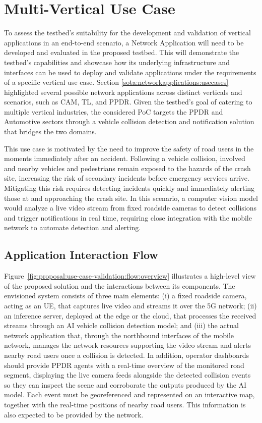 \section{Multi-Vertical Use Case}
\label{chap:proposal:use-case}

To assess the testbed's suitability for the development and validation of vertical applications in an end-to-end scenario, a Network Application will need to be developed and evaluated in the proposed testbed. This will demonstrate the testbed's capabilities and showcase how its underlying infrastructure and interfaces can be used to deploy and validate applications under the requirements of a specific vertical use case. Section \ref{sota:networkapplications:usecases} highlighted several possible network applications across distinct verticals and scenarios, such as \ac{CAM}, \ac{TL}, and \ac{PPDR}. Given the testbed's goal of catering to multiple vertical industries, the considered \ac{PoC} targets the \ac{PPDR} and Automotive sectors through a vehicle collision detection and notification solution that bridges the two domains.

This use case is motivated by the need to improve the safety of road users in the moments immediately after an accident. Following a vehicle collision, involved and nearby vehicles and pedestrians remain exposed to the hazards of the crash site, increasing the risk of secondary incidents before emergency services arrive. Mitigating this risk requires detecting incidents quickly and immediately alerting those at and approaching the crash site. In this scenario, a computer vision model would analyze a live video stream from fixed roadside cameras to detect collisions and trigger notifications in real time, requiring close integration with the mobile network to automate detection and alerting.

\subsection{Application Interaction Flow}
\label{chap:proposal:use-case:flow}

Figure~\ref{fig:proposal:use-case-validation:flow:overview} illustrates a high-level view of the proposed solution and the interactions between its components. The envisioned system consists of three main elements: (i) a fixed roadside camera, acting as an \acs{UE}, that captures live video and streams it over the \acs{5G} network; (ii) an inference server, deployed at the edge or the cloud, that processes the received streams through an \acs{AI} vehicle collision detection model; and (iii) the actual network application that, through the northbound interfaces of the mobile network, manages the network resources supporting the video stream and alerts nearby road users once a collision is detected. In addition, operator dashboards should provide \acs{PPDR} agents with a real-time overview of the monitored road segment, displaying the live camera feeds alongside the detected collision events so they can inspect the scene and corroborate the outputs produced by the \acs{AI} model. Each event must be georeferenced and represented on an interactive map, together with the real-time positions of nearby road users. This information is also expected to be provided by the network.


